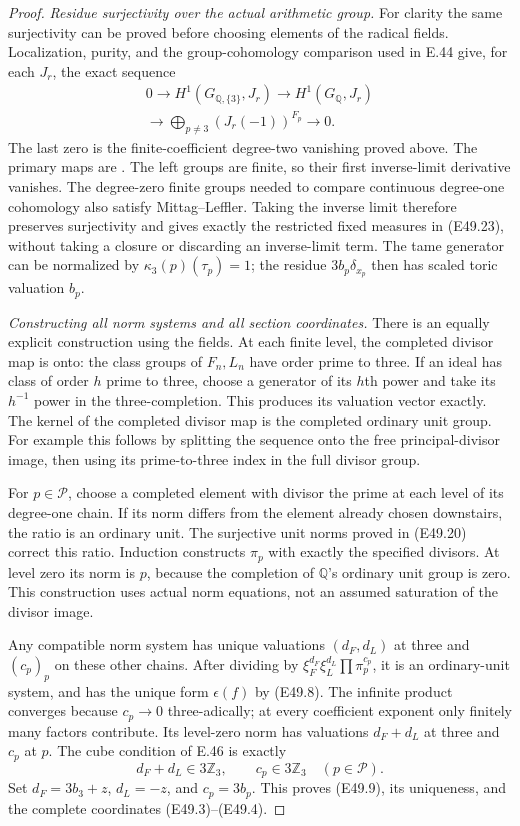 \begin{proof}
\emph{Residue surjectivity over the actual arithmetic group.}
For clarity the same
surjectivity can be proved
before choosing elements
of the radical fields.
Localization, purity, and
the group-cohomology
comparison used in E.44
give, for each $J_r$, the
exact sequence
\[
 \begin{gathered}
 0\longrightarrow
 H^1(G_{\mathbb Q,\{3\}},J_r)
 \longrightarrow H^1(G_{\mathbb Q},J_r)\\
 \longrightarrow
   \bigoplus_{p\ne3}(J_r(-1))^{F_p}
 \longrightarrow0 .
 \end{gathered}
 \tag{E49.24}
\]
The last zero is the
finite-coefficient
degree-two vanishing
proved above. The
primary maps are
\cite[II.0.1(f), II.1.7(b), II.2.9]{E_MilneADT}.
The left groups are
finite, so their first
inverse-limit derivative
vanishes. The degree-zero
finite groups needed to
compare continuous
degree-one cohomology
also satisfy
Mittag--Leffler.
Taking the inverse limit
therefore preserves
surjectivity and gives
exactly the restricted
fixed measures in
(E49.23), without
taking a closure or
discarding an inverse-limit
term. The tame generator
can be normalized by
$\kappa_3(p)(\tau_p)=1$;
the residue $3b_p\delta_{x_p}$
then has scaled toric
valuation $b_p$.

\emph{Constructing all norm systems and all section coordinates.}
There is an equally
explicit construction
using the fields.
At each finite level,
the completed divisor
map is onto: the class
groups of $F_n,L_n$
have order prime to
three. If an ideal
has class of order $h$
prime to three, choose
a generator of its
$h$th power and take
its $h^{-1}$ power
in the three-completion.
This produces its
valuation vector exactly.
The kernel of the
completed divisor map
is the completed
ordinary unit group.
For example this follows
by splitting the
sequence onto the
free principal-divisor
image, then using its
prime-to-three index
in the full divisor
group.

For $p\in\mathscr P$,
choose a completed
element with divisor
the prime at each
level of its degree-one
chain. If its norm
differs from the
element already chosen
downstairs, the ratio
is an ordinary unit.
The surjective unit
norms proved in
(E49.20) correct this
ratio. Induction
constructs $\pi_p$
with exactly the
specified divisors.
At level zero its
norm is $p$, because
the completion of
$\mathbb Q$'s ordinary
unit group is zero.
This construction
uses actual norm
equations, not an
assumed saturation
of the divisor image.

Any compatible norm
system has unique
valuations $(d_F,d_L)$
at three and $(c_p)_p$
on these other chains.
After dividing by
$\xi_F^{d_F}\xi_L^{d_L}
\prod\pi_p^{c_p}$,
it is an ordinary-unit
system, and has the
unique form $\epsilon(f)$
by (E49.8).
The infinite product
converges because
$c_p\to0$ three-adically;
at every coefficient
exponent only finitely
many factors contribute.
Its level-zero norm
has valuations
$d_F+d_L$ at three
and $c_p$ at $p$.
The cube condition
of E.46 is exactly
\[
       d_F+d_L\in3\mathbb Z_3,\qquad
              c_p\in3\mathbb Z_3\quad(p\in\mathscr P).
 \tag{E49.25}
\]
Set $d_F=3b_3+z$,
$d_L=-z$, and $c_p=3b_p$.
This proves (E49.9),
its uniqueness, and
the complete coordinates
(E49.3)--(E49.4).


\end{proof}
